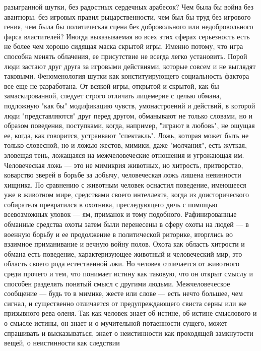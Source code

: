 \documentclass[12pt]{article}
\begin{document}
разыгранной шутки, без радостных сердечных арабесок? Чем была бы война без авантюры, без игровых правил
рыцарственности, чем был бы труд без игрового гения, чем была бы политическая сцена без добровольного или
недобровольного фарса властителей? Иногда выказываемая во всех этих сферах серьезность есть не более чем
хорошо сидящая маска скрытой игры. Именно потому, что игра способна менять облачения, ее присутствие не
всегда  легко  установить.  Порой  люди  застают  друг  друга  за  игровыми  действиями,  которые  совсем  и  не
выглядят  таковыми.  Феноменология  шутки  как  конституирующего  социальность  фактора  все  еще  не
разработана. От всякой игры, открытой и скрытой, как бы замаскированной, следует строго отличать лицемерие
с  целью  обмана,  подложную  "как  бы"  модификацию  чувств,  умонастроений  и  действий,  в  которой  люди
"представляются" друг перед другом, обманывают не только словами, но и образом поведения, поступками,
когда, например, "играют в любовь", не ощущая ее, когда, как говорится, устраивают "спектакль". Ложь, которая
может быть не только словесной, но и ложью жестов, мимики, даже "молчания", есть жуткая, зловещая тень,
ложащаяся  на  межчеловеческие  отношения  и  угрожающая  им.  Человеческая  ложь  ---  это  не  мимикрия
животных,  но  хитрость,  притворство,  коварство  зверей  в  борьбе  за  добычу,  человеческая  ложь  лишена
невинности хищника. По сравнению с животным человек оснастил поведение, имеющееся уже в животном
мире,  средствами  своего  интеллекта,  когда  из  доисторического  собирателя  превратился  в  охотника,
преследующего дичь с помощью всевозможных уловок --- ям, приманок и тому подобного. Рафинированные
обманные  средства  охоты  затем  были  перенесены  в  сферу  охоты  на  людей  ---  в  военную  борьбу  и  ее
продолжение в политической риторике, вторглись во взаимное приманивание и вечную войну полов. Охота как
область хитрости и обмана есть поведение, характеризующее животный и человеческий мир, это область своего
рода естественной лжи. Но человек отличается от животного среди прочего и тем, что понимает истину как
таковую, что он открыт смыслу и способен разделять понятый смысл с другими людьми. Межчеловеческое
сообщение --- будь то в мимике, жесте или слове --- есть нечто большее, чем сигнал, и существенно отличается от
предупреждающего свиста серны или же призывного рева оленя. Так как человек знает об истине, об истине
смыслового  и  о  смысле  истины,  он  знает  и  о  мучительной  потаенности  сущего,  может  спрашивать  и
высказываться,  знает  о  неистинности  как  проходящей  замкнутости  вещей,  о  неистинности  как  следствии
\end{document}
